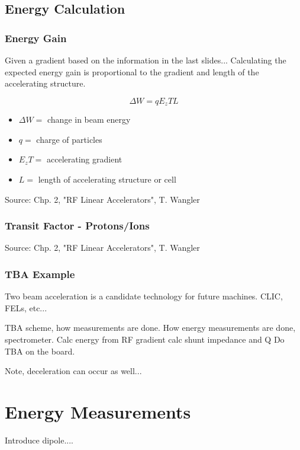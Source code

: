\documentclass[professionalfonts,t]{beamer}
\begin{document}
\subsection{Energy Calculation}
\begin{frame}
\frametitle{Energy Gain}
Given a gradient based on the information in the last slides...
Calculating the expected energy gain is proportional to the gradient and length of the accelerating structure. 

\begin{equation}
	\Delta W = qE_zTL
\end{equation}

\begin{itemize}
	\item $\Delta W = $ change in beam energy
	\item $q =$ charge of particles
	\item $E_zT = $ accelerating gradient
	\item $L = $ length of accelerating structure or cell 
\end{itemize}

\vspace{1em}
Source: Chp. 2, "RF Linear Accelerators", T. Wangler
\end{frame}


\begin{frame}
\frametitle{Transit Factor - Protons/Ions}
\vspace{1em}
Source: Chp. 2, "RF Linear Accelerators", T. Wangler
\end{frame}

\begin{frame}
	\frametitle{TBA Example}

	
	Two beam acceleration is a candidate technology for future machines.
	CLIC, FELs, etc...
	
	TBA scheme, how measurements are done. 
How energy measurements are done, spectrometer.
Calc energy from RF gradient
calc shunt impedance and Q
Do TBA on the board.	

	Note, deceleration can occur as well...
	
\end{frame}



\section{Energy Measurements}
\begin{frame}
	Introduce dipole....
\end{frame}
\end{document}
